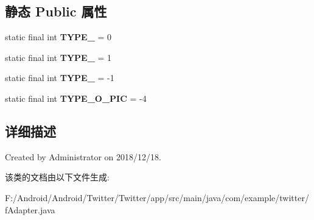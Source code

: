 \subsection*{静态 Public 属性}
\begin{DoxyCompactItemize}
\item 
\mbox{\label{classcom_1_1example_1_1twitter_1_1f_adapter_a2709428e0751d7855c80d8c5fa71b37f}} 
static final int {\bfseries T\+Y\+P\+E\+\_} = 0
\item 
\mbox{\label{classcom_1_1example_1_1twitter_1_1f_adapter_a342acd80b8a988027ee58bec6b74f566}} 
static final int {\bfseries T\+Y\+P\+E\+\_} = 1
\item 
\mbox{\label{classcom_1_1example_1_1twitter_1_1f_adapter_abca5b650e70f604a566146dd445adce4}} 
static final int {\bfseries T\+Y\+P\+E\+\_} = -\/1
\item 
\mbox{\label{classcom_1_1example_1_1twitter_1_1f_adapter_a34dfb73024dd135fbaffc9151676d71d}} 
static final int {\bfseries T\+Y\+P\+E\+\_\+\+O\+\_\+\+P\+IC} = -\/4
\end{DoxyCompactItemize}


\subsection{详细描述}
Created by Administrator on 2018/12/18. 

该类的文档由以下文件生成\+:\begin{DoxyCompactItemize}
\item 
F\+:/\+Android/\+Android/\+Twitter/\+Twitter/app/src/main/java/com/example/twitter/f\+Adapter.\+java\end{DoxyCompactItemize}
